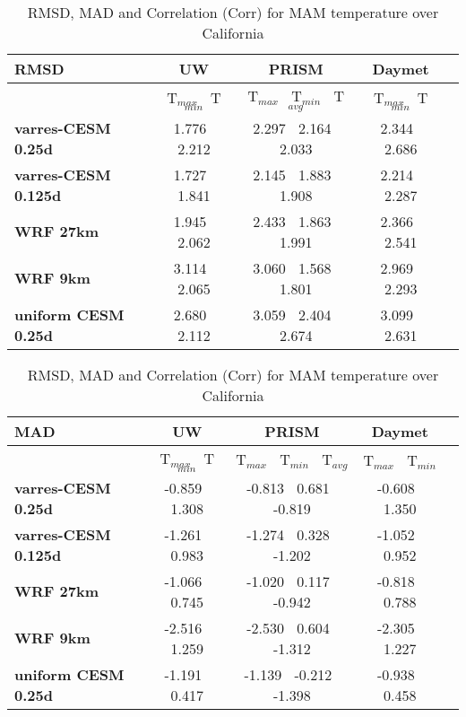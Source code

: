 \begin{table}
\begin{center}
\caption{RMSD, MAD and Correlation (Corr) for MAM temperature over California} 
\begin{tabular}{lcccc}
\hline \textbf{RMSD} & \textbf{UW}  & \textbf{PRISM} & \textbf{Daymet} \\
\hline $    $ & T$_{max}$ $\     $  T$_{min}$ & T$_{max}$ $\     $  T$_{min}$ $\     $ T$_{avg}$& T$_{max}$ $\     $  T$_{min}$\\
\hline \textbf{varres-CESM 0.25d} & 1.776 $\ $ 2.212 & 2.297 $\ $ 2.164 $\ $ 2.033 & 2.344 $\ $ 2.686 \\
\textbf{varres-CESM 0.125d} & 1.727 $\ $ 1.841 & 2.145 $\ $ 1.883 $\ $ 1.908 & 2.214 $\ $ 2.287 \\
\textbf{WRF 27km} & 1.945 $\ $ 2.062 & 2.433 $\ $ 1.863 $\ $ 1.991 & 2.366 $\ $ 2.541 \\
\textbf{WRF 9km} & 3.114 $\ $ 2.065 & 3.060 $\ $ 1.568 $\ $ 1.801 & 2.969 $\ $ 2.293 \\
\textbf{uniform CESM 0.25d} & 2.680 $\ $ 2.112 & 3.059 $\ $ 2.404 $\ $ 2.674 & 3.099 $\ $ 2.631 \\
\hline
\end{tabular}

\begin{tabular}{lcccc}
\hline \textbf{MAD} & \textbf{UW}  & \textbf{PRISM} & \textbf{Daymet} \\
\hline $    $ & T$_{max}$ $\     $  T$_{min}$ & T$_{max}$ $\     $  T$_{min}$ $\     $ T$_{avg}$& T$_{max}$ $\     $  T$_{min}$\\
\hline \textbf{varres-CESM 0.25d} & -0.859 $\ $ 1.308 & -0.813 $\ $ 0.681 $\ $ -0.819 & -0.608 $\ $ 1.350 \\
\textbf{varres-CESM 0.125d} & -1.261 $\ $ 0.983 & -1.274 $\ $ 0.328 $\ $ -1.202 & -1.052 $\ $ 0.952 \\
\textbf{WRF 27km} & -1.066 $\ $ 0.745 & -1.020 $\ $ 0.117 $\ $ -0.942 & -0.818 $\ $ 0.788 \\
\textbf{WRF 9km} & -2.516 $\ $ 1.259 & -2.530 $\ $ 0.604 $\ $ -1.312 & -2.305 $\ $ 1.227 \\
\textbf{uniform CESM 0.25d} & -1.191 $\ $ 0.417 & -1.139 $\ $ -0.212 $\ $ -1.398 & -0.938 $\ $ 0.458 \\
\hline
\end{tabular}


\end{center}
\end{table}
